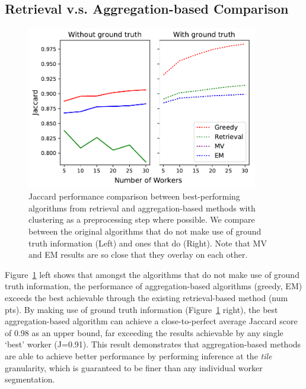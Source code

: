 \subsection{Retrieval v.s. Aggregation-based Comparison}
 \begin{figure}[h!]
   \vspace{-10pt}
   \centering
   \includegraphics[width=0.9\textwidth]{plots/Retrieval_vs_Aggregation.pdf}
   \caption{Jaccard performance comparison between best-performing algorithms from retrieval and aggregation-based methods with clustering as a preprocessing step where possible. We compare between the original algorithms that do not make use of ground truth information (Left) and ones that do (Right). Note that MV and EM results are so close that they overlay on each other.}
   \label{retrieval_vs_aggregation}   
\end{figure} 
\vspace{-10pt}

\par \noindent Figure~\ref{retrieval_vs_aggregation} left shows that amongst the algorithms that do not make use of ground truth information, the performance of aggregation-based algorithms (greedy, EM) exceeds the best achievable through the existing retrieval-based method (num pts). By making use of ground truth information (Figure~\ref{retrieval_vs_aggregation} right), the best aggregation-based algorithm can achieve a close-to-perfect average Jaccard score of 0.98 as an upper bound, far exceeding the results achievable by any single `best' worker (J=0.91). This result demonstrates that aggregation-based methods are able to achieve better performance by performing inference at the \textit{tile} granularity, which is guaranteed to be finer than any individual worker segmentation. 

